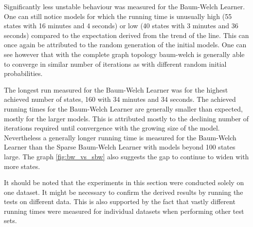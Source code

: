 Significantly less unstable behaviour was measured for the Baum-Welch Learner. One can still notice models for which the running time is unusually high (55 states with 16 minutes and 4 seconds) or low (40 states with 3 minutes and 36 seconds) compared to the expectation derived from the trend of the line. This can once again be attributed to the random generation of the initial models. One can see however that with the complete graph topology \gls{baum-welch} is generally able to converge in similar number of iterations as with different random initial probabilities.

The longest run measured for the Baum-Welch Learner was for the highest achieved number of states, 160 with 34 minutes and 34 seconds. The achieved running times for the Baum-Welch Learner are generally smaller than expected, mostly for the larger models. This is attributed mostly to the declining number of iterations required until convergence with the growing size of the model. Nevertheless a generally longer running time is measured for the Baum-Welch Learner than the Sparse Baum-Welch Learner with models beyond 100 states large. The graph \ref{fig:bw_vs_sbw} also suggests the gap to continue to widen with more states.

It should be noted that the experiments in this section were conducted solely on one dataset. It might be necessary to confirm the derived results by running the tests on different data. This is also supported by the fact that vastly different running times were measured for individual datasets when performing other test sets.